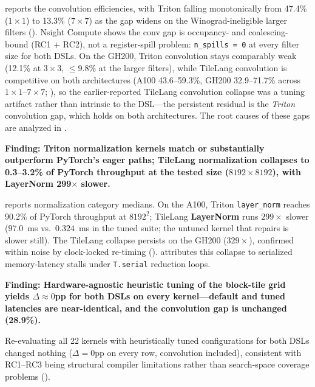  reports the convolution efficiencies, with Triton falling monotonically from 47.4\% ($1\times1$) to 13.3\% ($7\times7$) as the gap widens on the Winograd-ineligible larger filters ().
Nsight Compute shows the conv gap is occupancy- and coalescing-bound (RC1 + RC2), not a register-spill problem: \texttt{n\_spills = 0} at every filter size for both DSLs.
On the GH200, Triton convolution stays comparably weak (12.1\% at $3\times3$, $\le$9.8\% at the larger filters), while TileLang convolution is competitive on both architectures (A100 43.6--59.3\%, GH200 32.9--71.7\% across $1\times1$--$7\times7$; ), so the earlier-reported TileLang convolution collapse was a tuning artifact rather than intrinsic to the DSL---the persistent residual is the \emph{Triton} convolution gap, which holds on both architectures.
The root causes of these gaps are analyzed in .

\label{sec:eval:norm}

\medskip\noindent\textbf{Finding: Triton normalization kernels match or substantially outperform PyTorch's eager paths; TileLang normalization collapses to 0.3--3.2\% of PyTorch throughput at the tested size ($8192 \times 8192$), with LayerNorm 299$\times$ slower.}

 reports normalization category medians.
On the A100, Triton \texttt{layer\_norm} reaches 90.2\% of PyTorch throughput at $8192^2$; TileLang \textbf{LayerNorm} runs $299\times$ slower ($97.0$~ms vs.\ $0.324$~ms in the tuned suite; the untuned kernel that  repairs is slower still).
The TileLang collapse persists on the GH200 ($329\times$), confirmed within noise by clock-locked re-timing ().
 attributes this collapse to serialized memory-latency stalls under \texttt{T.serial} reduction loops.

\label{sec:eval:tuning}

\medskip\noindent\textbf{Finding: Hardware-agnostic heuristic tuning of the block-tile grid yields $\Delta\approx0$pp for both DSLs on every kernel---default and tuned latencies are near-identical, and the convolution gap is unchanged (28.9\%).}

Re-evaluating all 22 kernels with heuristically tuned configurations for both DSLs changed nothing ($\Delta = 0$pp on every row, convolution included), consistent with RC1--RC3 being structural compiler limitations rather than search-space coverage problems ().

